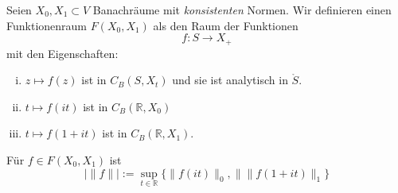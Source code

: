 \documentclass[
paper=a4,
bibtotocnumbered,
liststotocnumbered,
tablecaptionabove,
pointlessnumbers,
twoside,
openright,
10pt
]
{report}
\theoremstyle{definition}
\numberwithin{equation}{chapter}
\begin{document}

Seien $X_0, X_1\subset V$ Banachräume mit \emph{konsistenten} Normen. Wir definieren einen Funktionenraum $F(X_0, X_1)$ als den Raum der Funktionen
\begin{equation}
f: S \to X_+
\end{equation}
mit den Eigenschaften:
\begin{enumerate}[(i)]
\item $z\mapsto f(z)$ ist in $C_B(S, X_t)$ und sie ist analytisch in $\mathring S$.
\item $t\mapsto f(it)$ ist in $C_B(\mathbb R, X_0)$
\item $t\mapsto f(1+it)$ ist in $C_B(\mathbb R, X_1)$.
\end{enumerate}

Für $f\in F(X_0, X_1)$ ist
\begin{equation} \label{eq:30.6(1)}
|\| f \| |:= \sup_{t\in \mathbb R} \{ \| f(it)\|_0, \|  \| f(1+it)\|_1\}
\end{equation}
\end{document}
